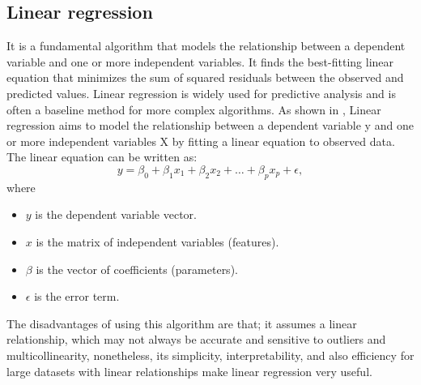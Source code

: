 \documentclass{book}
\numberwithin{equation}{section}
\numberwithin{figure}{section}
\begin{document}
\subsection{Linear regression}
\label{linear}
\vspace{-5mm} %
It is a fundamental algorithm that models the relationship between a dependent variable and one or more independent variables. It finds the best-fitting linear equation that minimizes the sum of squared residuals between the observed and predicted values. Linear regression is widely used for predictive analysis and is often a baseline method for more complex algorithms. As shown in \cite{linear_regression}, Linear regression aims to model the relationship between a dependent variable y and one or more independent variables X by fitting a linear equation to observed data. The linear equation can be written as:
\begin{equation}
y = \beta_0 + \beta_1 x_1 + \beta_2 x_2 + \ldots + \beta_p x_p + \epsilon,
\end{equation}
where
\begin{itemize}
    \item $y$ is the dependent variable vector.
    \item $x$ is the matrix of independent variables (features).
    \item $\beta$ is the vector of coefficients (parameters).
    \item $\epsilon$ is the error term.
\end{itemize}
The disadvantages of using this algorithm are that; it assumes a linear relationship, which may not always be accurate and sensitive to outliers and multicollinearity, nonetheless, its simplicity, interpretability, and also efficiency for large datasets with linear relationships make linear regression very useful. \\ 

\vspace{-5mm} %
\end{document}
